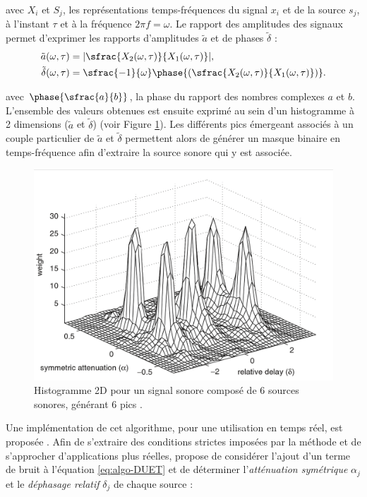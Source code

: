 avec $X_i$ et $S_j$, les représentations temps-fréquences du signal $x_i$ et de la source $s_j$, à l'instant $\tau$ et à la fréquence $2\pi f = \omega$.
Le rapport des amplitudes des signaux permet d'exprimer les rapports d'amplitudes $\tilde{a}$ et de phases $\tilde{\delta}$ :
\begin{subequations}
\begin{align}
\tilde{a}(\omega,\tau) &= \vert\sfrac{X_2(\omega,\tau)}{X_1(\omega,\tau)}\vert, \\
\tilde{\delta}(\omega,\tau) &= \sfrac{-1}{\omega}\phase{\left(\sfrac{X_2(\omega,\tau)}{X_1(\omega,\tau)}\right)}.
\end{align}
\end{subequations}

avec $\phase{\sfrac{a}{b}}$, la phase du rapport des nombres complexes $a$ et $b$.
L'ensemble des valeurs obtenues est ensuite exprimé au sein d'un histogramme à 2 dimensions ($\tilde{a}$ et $\tilde{\delta}$) (voir Figure \ref{fig:DUET_hist}).
Les différents pics émergeant associés à un couple particulier de $\tilde{a}$ et $\tilde{\delta}$ permettent alors de générer un masque binaire en temps-fréquence afin d'extraire la source sonore qui y est associée.

\begin{figure}[t]
\centering
\includegraphics[width = 0.6\linewidth]{./figures/autres/DUET_histogram.png}
\caption{Histogramme 2D pour un signal sonore composé de 6 sources sonores, générant 6 pics \cite{rickard2007duet}.}
\label{fig:DUET_hist}
\end{figure}

Une implémentation de cet algorithme, pour une utilisation en temps réel, est proposée \cite{rickard2001real}.
Afin de s'extraire des conditions strictes imposées par la méthode et de s'approcher d'applications plus réelles, \cite{rickard2007duet} propose de considérer l'ajout d'un terme de bruit à l'équation \ref{eq:algo-DUET} et de déterminer l'\textit{atténuation symétrique} $\alpha_j$ et le \textit{déphasage relatif} $\delta_j$ de chaque source :


